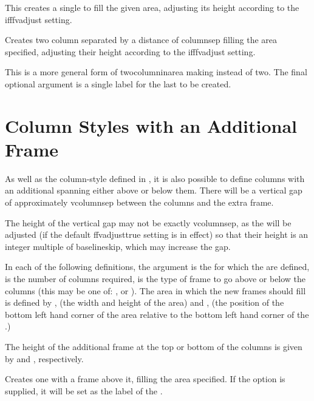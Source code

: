 \documentclass[fontsize=12pt]{scrbook}
\begin{document}
This creates a single  to fill the given area,
adjusting its height according to the \gls{ifffvadjust} setting.

Creates two column  separated by a distance
of \gls{columnsep} filling the area specified,
adjusting their height according to the \gls{ifffvadjust} setting.

This is a more general form of \gls{twocolumninarea} making 
  instead of two.
The final optional argument is a single label for the last
 to be created.

\section{Column Styles with an Additional Frame}
\label{sec:colstyleswithframe}

As well as the column-style  defined 
in , it is also possible to define
 columns with an additional  spanning either 
above or below them. There will be a vertical gap of 
approximately \gls{vcolumnsep} between the columns
and the extra frame.

\begin{information}
The height of the vertical gap may not be exactly \gls{vcolumnsep}, 
as the  will be adjusted (if the default
\gls{ffvadjusttrue} setting is in effect) so that their height 
is an integer multiple of \gls{baselineskip}, which may increase the gap.
\end{information}

In each of the following definitions,
the argument  is the  for which
the  are defined,  is the number of
columns required,  is the type of frame to go
above or below the columns (this may be one of: ,
 or ). The area in which the
new frames should fill is defined by ,  
(the width and height of the area) and ,  
(the position of the bottom left hand corner of the area
relative to the bottom left hand corner of the .)

The height of the additional frame at the top or bottom of
the columns is given by  and ,
respectively.

Creates one  with a  frame above it, filling
the area specified. If the  option is supplied, it will
be set as the label of the .
\end{document}
